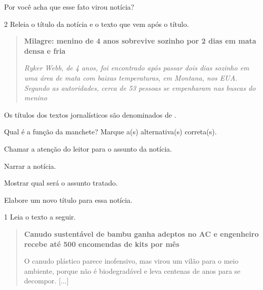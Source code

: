 \begin{escolha}
\begin{escolha}
{\begin{escolha}

\item Por você acha que esse fato virou notícia?

\end{escolha}

\num{2} Releia o título da notícia e o texto que vem após o título.

\begin{quote}
\textbf{Milagre: menino de 4 anos sobrevive sozinho por 2 dias em mata densa e fria}

\emph{Ryker Webb, de 4 anos, foi encontrado após passar dois dias
sozinho em uma área de mata com baixas temperaturas, em Montana, nos
EUA. Segundo as autoridades, cerca de 53 pessoas se empenharam nas
buscas do menino}
\end{quote}

\begin{escolha}
\item Os títulos dos textos jornalísticos são denominados de .

\item Qual é a função da manchete? Marque a(s) alternativa(s) correta(s).

\begin{boxlist}
\boxitem[\rosa{X}] Chamar a atenção do leitor para o assunto da notícia.

\boxitem[] Narrar a notícia.

\boxitem[\rosa{X}] Mostrar qual será o assunto tratado.
\end{boxlist}

\item Elabore um novo título para essa notícia.



\num{1} Leia o texto a seguir.

\begin{quote}
\textbf{Canudo sustentável de bambu ganha adeptos no AC e engenheiro
recebe até 500 encomendas de kits por mês}

O canudo plástico parece inofensivo, mas virou um vilão para o meio
ambiente, porque não é biodegradável e leva centenas de anos para se
decompor. {[}...{]}


\end{quote}
\end{escolha}}
\end{escolha}
\end{escolha}
